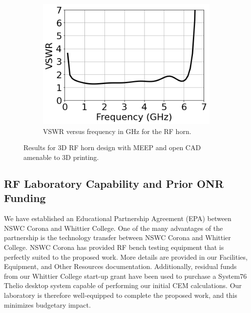 \documentclass[11pt]{amsart}
\begin{document}
\begin{figure}[ht]
\begin{subfigure}{0.65\textwidth}
\end{subfigure}
\hfill
\begin{subfigure}{0.3\textwidth}
    \includegraphics[width=0.99\textwidth]{figures/vswr.png}
	\caption{VSWR versus frequency in GHz for the RF horn.}
\end{subfigure}
\caption{Results for 3D RF horn design with MEEP and open CAD amenable to 3D printing.}
\label{fig:3d_cad}
\end{figure}

\subsection{RF Laboratory Capability and Prior ONR Funding}

We have established an Educational Partnership Agreement (EPA) between NSWC Corona and Whittier College.  One of the many advantages of the partnership is the technology transfer between NSWC Corona and Whittier College.  NSWC Corona has provided RF bench testing equipment that is perfectly suited to the proposed work.  More details are provided in our Facilities, Equipment, and Other Resources documentation.  Additionally, residual funds from our Whittier College start-up grant have been used to purchase a System76 Thelio desktop system capable of performing our initial CEM calculations.  Our laboratory is therefore well-equipped to complete the proposed work, and this minimizes budgetary impact.  
\end{document}
